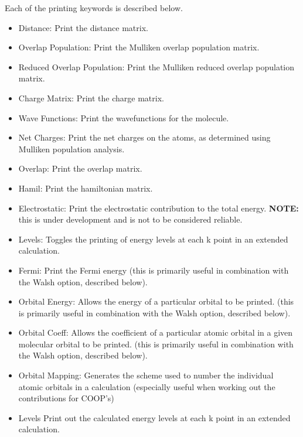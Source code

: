 \noindent Each of the printing keywords is described below.

\begin{itemize}

\item {\sf Distance:}
Print the distance matrix.

\item {\sf Overlap Population:}
Print the Mulliken overlap population matrix.

\item {\sf Reduced Overlap Population:}
Print the Mulliken reduced overlap population matrix.

\item {\sf Charge Matrix:}
Print the charge matrix.


\item {\sf Wave Functions:}
Print the wavefunctions for the molecule.

\item {\sf Net Charges:}
Print the net charges on the atoms, as determined using Mulliken
population analysis.

\item {\sf Overlap:}
Print the overlap matrix.

\item {\sf Hamil:}
Print the hamiltonian matrix.

\item {\sf Electrostatic:}
Print the electrostatic contribution to the total energy.  {\bf NOTE:}
this is under development and is not to be considered reliable.

\item {\sf Levels:}
Toggles the printing of energy levels at each k point in an extended
calculation. 

\item {\sf Fermi:}
Print the Fermi energy (this is primarily useful in combination with
the Walsh option, described below). 


\item {\sf Orbital Energy:}
Allows the energy of a particular orbital to be printed.  (this is
primarily useful in combination with 
the Walsh option, described below). 

\item {\sf Orbital Coeff:}
Allows the coefficient of a particular atomic orbital in a given
molecular orbital to be printed.  (this is
primarily useful in combination with 
the Walsh option, described below). 

\item {\sf Orbital Mapping:}
Generates the scheme used to number the individual atomic orbitals in a calculation (especially useful when working out the contributions for COOP's)

\item {\sf Levels}
Print out the calculated energy levels at each k point in an extended
calculation. 
\end{itemize}

